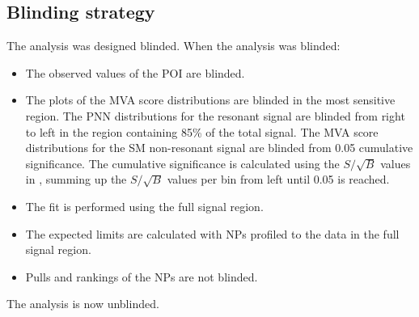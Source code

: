 \subsection{Blinding strategy}

The analysis was designed blinded. When the analysis was blinded:

\begin{itemize}
\item The observed values of the POI are blinded. 
\item The plots of the MVA score distributions are blinded in the most sensitive region. The PNN distributions for the resonant signal are blinded from right to left in the region containing 85\% of the total signal. The MVA score distributions for the SM non-resonant signal are blinded from 0.05 cumulative significance. The cumulative significance is 
calculated using the $S/\sqrt{B}$ values in , summing up the $S/\sqrt{B}$ values per bin from left until 0.05 is reached.
\item The fit is performed using the full signal region. 
\item The expected limits are calculated with NPs profiled to the data in the full signal region. 
\item Pulls and rankings of the NPs are not blinded. 
\end{itemize}

The analysis is now unblinded.
